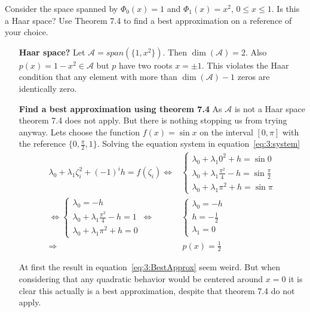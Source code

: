 \begin{problem}
  Consider the space spanned by $\Phi_0(x) = 1$ and
  $\Phi_1(x) = x^2 ,\, 0 \leq x ≤ 1$. Is this a Haar space? Use
  Theorem 7.4 to find a best approximation on a reference of your
  choice.
\end{problem}


 \begin{solution}
   \begin{enumerate}
     \item[\bf Haar space?] Let $\mathcal{A} = span(\{1, x^2\})$. Then
       $\dim(\mathcal{A}) = 2$. Also $ p(x) = 1 - x^2 \in \mathcal{A}$
       but $p$ have two roots $x = \pm 1$. This violates the Haar
      condition that any element with more than $\dim(\mathcal{A}) -
      1$ zeros are identically zero.
    \item[\bf Find a best approximation using theorem 7.4]
      As $\mathcal{A}$ is not a Haar space theorem 7.4 does not
      apply. But there is nothing stopping us from trying anyway. Lets
      choose the function $f(x) = \sin x$ on the interval $[0, \pi]$
      with the reference $\{0, \frac{\pi}{2}, 1 \}$. Solving the
      equation system in equation~\ref{eq:3:system}
       \begin{align}
         \label{eq:3:system}
         \lambda_0 + \lambda_1 \zeta_{i}^{2} + {(-1)}^{i}h = f(\zeta_i) 
         \Leftrightarrow &
        \begin{cases} 
          \lambda_0 + \lambda_1 0^2 + h = \sin 0 \\
          \lambda_0 + \lambda_1 {\frac{\pi^2}{4}} - h =
          \sin \frac{\pi}{2} \\
          \lambda_0 + \lambda_1 {\pi}^2 + h = \sin \pi
        \end{cases} \\
         \Leftrightarrow \nonumber
        \begin{cases}
          \lambda_0 = -h \\
          \lambda_0 + \lambda_1 \frac{\pi^2}{4} - h = 1 \\
          \lambda_0 + \lambda_1 {\pi}^2 + h = 0
        \end{cases} 
        \Leftrightarrow & 
        \begin{cases}
          \lambda_0 = -h \\
          h = -\frac{1}{2} \\
          \lambda_1  = 0
        \end{cases} \\
        \Rightarrow & \, 
        p(x) = \frac{1}{2} \label{eq:3:BestApprox}
       \end{align}

       At first the result in equation~\ref{eq:3:BestApprox} seem
       weird. But when considering that any quadratic behavior would
       be centered around $x=0$ it is clear this actually is a best
       approximation, despite that theorem 7.4 do not apply.
      
     \end{enumerate}
    
   \end{solution}

